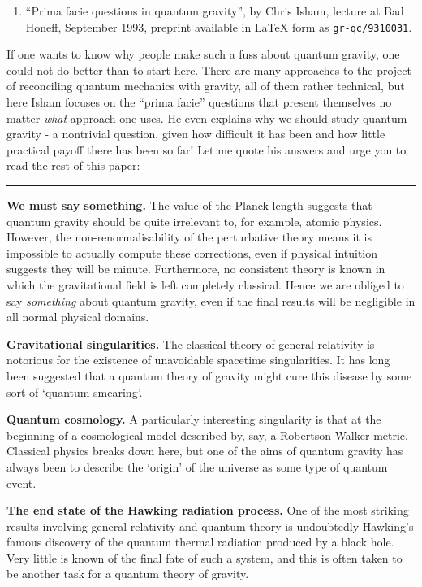 \documentclass{article}
\def\tightlist{}
\begin{document}
\begin{enumerate}
\def\labelenumi{\arabic{enumi})}
\tightlist
\item
  ``Prima facie questions in quantum gravity'', by Chris Isham, lecture
  at Bad Honeff, September 1993, preprint available in LaTeX form as
  \href{http://xxx.lanl.gov/abs/gr-qc/9310031}{\texttt{gr-qc/9310031}}.
\end{enumerate}

If one wants to know why people make such a fuss about quantum gravity,
one could not do better than to start here. There are many approaches to
the project of reconciling quantum mechanics with gravity, all of them
rather technical, but here Isham focuses on the ``prima facie''
questions that present themselves no matter \emph{what} approach one
uses. He even explains why we should study quantum gravity - a
nontrivial question, given how difficult it has been and how little
practical payoff there has been so far! Let me quote his answers and
urge you to read the rest of this paper:

\begin{center}\rule{0.5\linewidth}{0.5pt}\end{center}

\textbf{We must say something.} The value of the Planck length suggests
that quantum gravity should be quite irrelevant to, for example, atomic
physics. However, the non-renormalisability of the perturbative theory
means it is impossible to actually compute these corrections, even if
physical intuition suggests they will be minute. Furthermore, no
consistent theory is known in which the gravitational field is left
completely classical. Hence we are obliged to say \emph{something} about
quantum gravity, even if the final results will be negligible in all
normal physical domains.

\textbf{Gravitational singularities.} The classical theory of general
relativity is notorious for the existence of unavoidable spacetime
singularities. It has long been suggested that a quantum theory of
gravity might cure this disease by some sort of `quantum smearing'.

\textbf{Quantum cosmology.} A particularly interesting singularity is
that at the beginning of a cosmological model described by, say, a
Robertson-Walker metric. Classical physics breaks down here, but one of
the aims of quantum gravity has always been to describe the `origin' of
the universe as some type of quantum event.

\textbf{The end state of the Hawking radiation process.} One of the most
striking results involving general relativity and quantum theory is
undoubtedly Hawking's famous discovery of the quantum thermal radiation
produced by a black hole. Very little is known of the final fate of such
a system, and this is often taken to be another task for a quantum
theory of gravity.
\end{document}
